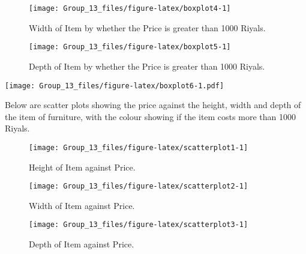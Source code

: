 \documentclass[
]{article}
\begin{document}
\begin{figure}[H]

{\centering \texttt{[image: Group\_13\_files/figure-latex/boxplot4-1]} 

}

\caption{\label{fig:boxplot4} Width of Item by whether the Price is greater than 1000 Riyals.}\label{fig:boxplot4}
\end{figure}

\begin{figure}[H]

{\centering \texttt{[image: Group\_13\_files/figure-latex/boxplot5-1]} 

}

\caption{\label{fig:boxplot5} Depth of Item by whether the Price is greater than 1000 Riyals.}\label{fig:boxplot5}
\end{figure}

\texttt{[image: Group\_13\_files/figure-latex/boxplot6-1.pdf]}

Below are scatter plots showing the price against the height, width and
depth of the item of furniture, with the colour showing if the item
costs more than 1000 Riyals.

\begin{figure}[H]

{\centering \texttt{[image: Group\_13\_files/figure-latex/scatterplot1-1]} 

}

\caption{\label{fig:scatterplot1} Height of Item against Price.}\label{fig:scatterplot1}
\end{figure}

\begin{figure}[H]

{\centering \texttt{[image: Group\_13\_files/figure-latex/scatterplot2-1]} 

}

\caption{\label{fig:scatterplot2} Width of Item against Price.}\label{fig:scatterplot2}
\end{figure}

\begin{figure}[H]

{\centering \texttt{[image: Group\_13\_files/figure-latex/scatterplot3-1]} 

}

\caption{\label{fig:scatterplot3} Depth of Item against Price.}\label{fig:scatterplot3}
\end{figure}
\end{document}
